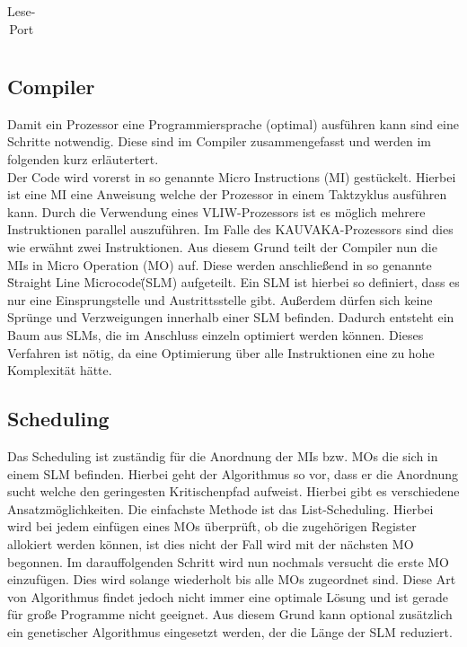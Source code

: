 \begin{table}[htbp]
\begin{minipage}{.4\textwidth}
\begin{tabular}{cccccccccccccccccc}
		\end{tabular}
		\caption{\label{lese-port}Lese-Port}
	\end{minipage}
\end{table}


\subsection{Compiler}
Damit ein Prozessor eine Programmiersprache (optimal) ausführen kann sind eine Schritte notwendig. Diese sind im Compiler zusammengefasst und werden im folgenden kurz erläutertert.\\
Der Code wird vorerst in so genannte Micro Instructions (MI) gestückelt.  Hierbei ist eine MI eine Anweisung welche der Prozessor in einem Taktzyklus ausführen kann. Durch die Verwendung eines VLIW-Prozessors ist es möglich mehrere Instruktionen parallel auszuführen. Im Falle des KAUVAKA-Prozessors sind dies wie erwähnt zwei Instruktionen. Aus diesem Grund teilt der Compiler nun die MIs in Micro Operation (MO) auf. Diese werden anschließend in so genannte \"Straight Line Microcode\" (SLM) aufgeteilt. Ein SLM ist hierbei so definiert, dass es nur eine Einsprungstelle und Austrittsstelle gibt. Außerdem dürfen sich keine Sprünge und Verzweigungen innerhalb einer SLM befinden.  Dadurch entsteht ein Baum aus SLMs, die im Anschluss einzeln optimiert werden können. Dieses Verfahren ist nötig, da eine Optimierung über alle Instruktionen eine zu hohe Komplexität hätte. 
\subsection{Scheduling}
Das Scheduling ist zuständig für die Anordnung der MIs bzw. MOs die sich in einem SLM befinden. Hierbei geht der Algorithmus so vor, dass er die Anordnung sucht welche den geringesten Kritischenpfad aufweist. Hierbei gibt es verschiedene Ansatzmöglichkeiten. Die einfachste Methode ist das List-Scheduling. Hierbei wird bei jedem einfügen eines MOs überprüft, ob die zugehörigen Register allokiert werden können, ist dies nicht der Fall wird mit der nächsten MO begonnen. Im darauffolgenden Schritt wird nun nochmals versucht die erste MO einzufügen. Dies wird solange wiederholt bis alle MOs zugeordnet sind.
Diese Art von Algorithmus findet jedoch nicht immer eine optimale Lösung und ist gerade für große Programme nicht geeignet. Aus diesem Grund kann optional zusätzlich ein genetischer Algorithmus eingesetzt werden, der die Länge der SLM reduziert.


